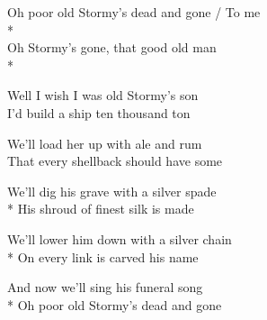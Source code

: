 
\contd
{}

\versemark
Oh poor old Stormy’s dead and gone / To me\\*
\vin{}\\
Oh Stormy’s gone, that good old man\\*
\vin{}

\versemark
Well I wish I was old Stormy’s son\etc\\
I’d build a ship ten thousand ton\etc

\versemark
We’ll load her up with ale and rum\etc\\
That every shellback should have some\etc

\versemark
We'll dig his grave with a silver spade\etc\\*
His shroud of finest silk is made\etc

\versemark
We’ll lower him down with a silver chain\etc\\*
On every link is carved his name\etc

\versemark
And now we’ll sing his funeral song\etc\\*
Oh poor old Stormy’s dead and gone\etc

